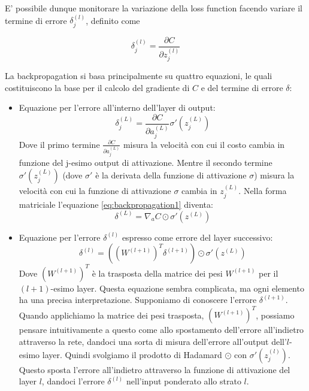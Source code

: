  E’ possibile dunque monitorare la variazione della loss function facendo variare il
 termine di errore  $\delta_{j}^{(l)}$, definito come

 \begin{equation}
    \delta_{j}^{(l)} = \frac{\partial C}{\partial z_{j}^{(l)}}
 \end{equation}

 La backpropagation si basa principalmente su quattro equazioni, le quali costituiscono
 la base per il calcolo del gradiente di $C$ e del termine di errore $\delta$:

 \begin{itemize}
    \item  Equazione per l’errore all’interno dell'layer di output:
    \begin{equation}
        \delta_{j}^{(L)} = \frac{\partial C}{\partial a_{j}^{(L)}}\sigma ' (z_{j}^{(L)}) 
        \label{eq:backpropagation1}
    \end{equation}
    Dove il primo termine $\frac{\partial C}{\partial a_{j}^{(L)}}$ misura la velocità con cui il 
    costo cambia in funzione del j-esimo output di attivazione. Mentre il secondo termine 
    $\sigma ' (z_{j}^{(L)}) $ (dove $\sigma'$ è la derivata della funzione di attivazione $\sigma$)
    misura la velocità con cui la funzione di attivazione $\sigma$ cambia in $z_{j}^{(L)}$.
    Nella forma matriciale l'equazione \eqref{eq:backpropagation1} diventa:
    \begin{equation}
        \delta^{(L)} = \nabla_{a}C \odot \sigma '(z^{(L)}) 
    \end{equation}

    \item Equazione per l’errore $\delta^{(l)}$ espresso come errore del layer successivo:
    \begin{equation}
        \delta^{(l)} = ((W^{(l+1)})^{T} \delta^{(l+1)}) \odot \sigma '(z^{(L)})
        \label{eq:backpropagation2}
    \end{equation}
    Dove $(W^{(l+1)})^{T}$ è la trasposta della matrice dei pesi $W^{(l+1)}$ per il $(l+1)$-esimo layer. 
    Questa equazione sembra complicata, ma ogni elemento ha una precisa interpretazione. 
    Supponiamo di conoscere l'errore $\delta^{(l+1)}$. Quando applichiamo la matrice dei pesi 
    trasposta, $(W^{(l+1)})^{T}$, possiamo pensare intuitivamente a questo come allo spostamento 
    dell'errore all'indietro attraverso la rete, dandoci una sorta di misura dell'errore 
    all'output dell'$l$-esimo layer. Quindi svolgiamo il prodotto di Hadamard $\odot$ con 
    $\sigma '(z_{j}^{(l)})$. Questo sposta l'errore all'indietro attraverso la funzione di 
    attivazione del layer $l$, dandoci l'errore $\delta^{(l)}$ nell'input ponderato allo strato $l$.


\end{itemize}
